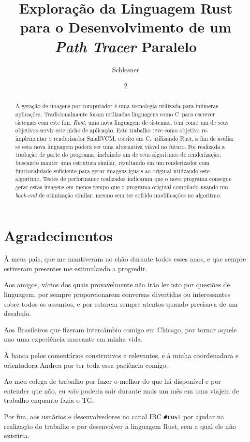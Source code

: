\documentclass[tg]{mdtufsm}
\title{Exploração da Linguagem Rust para o Desenvolvimento de um \emph{Path Tracer} Paralelo}
\author{Schlesner}{Yuri Kunde}
\institute{Centro de Tecnologia}
\date{2}{Dezembro}{2014}
\def\Cpp{{C\nolinebreak[4]\raisebox{.20ex}{\small\bf++}}}
\begin{document}
\maketitle
\makeapprove

\chapter*{Agradecimentos}
À meus pais, que me mantiveram no chão durante todos esses anos, e que sempre estiveram presentes me estimulando a progredir.

Aos amigos, vários dos quais provavelmente não irão ler isto por questões de linguagem, por sempre proporcionarem conversas divertidas ou interessantes sobre todos os assuntos, e por estarem sempre atentos quando precisava de um desabafo.

Aos Brasileiros que fizeram intercâmbio comigo em Chicago, por tornar aquele ano uma experiência marcante em minha vida.

À banca pelos comentários construtivos e relevantes, e à minha coordenadora e orientadora Andrea por ter toda essa paciência comigo.

Ao meu colega de trabalho por fazer o melhor do que há disponível e por entender que não, eu \emph{não} poderia sair durante mais um mês em uma viajem de trabalho enquanto fazia o TG. 

Por fim, aos usuários e desenvolvedores no canal IRC \texttt{\#rust} por ajudar na realização do trabalho e por desenvolver a linguagem Rust, sem a qual ele não existiria.

\begin{abstract}
A geração de imagens por computador é uma tecnologia utilizada para inúmeras aplicações.
Tradicionalmente foram utilizadas linguagens como \Cpp\ para escrever sistemas com este fim. \emph{Rust},
uma nova linguagem de sistemas, tem como um de seus objetivos servir este nicho de aplicação. Este
trabalho teve como objetivo re-implementar o renderizador SmallVCM, escrito em \Cpp, utilizando
Rust, a fim de avaliar se esta nova linguagem poderá ser uma alternativa viável no futuro. Foi
realizada a tradução de parte do programa, incluindo um de seus algoritmos de renderização, buscando
manter uma estrutura similar, resultando em um renderizador com funcionalidade suficiente para gerar
imagens iguais ao original utilizando este algoritmo. Testes de performance realizados indicaram que
o novo programa consegue gerar estas imagens em menos tempo que o programa original compilado usando
um \emph{back-end} de otimização similar, mesmo sem ter sofrido modificações no algoritmo.
\end{abstract}
\end{document}
